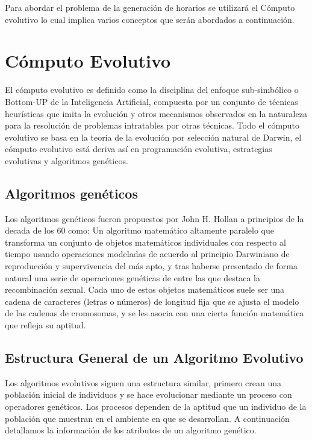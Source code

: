 \label{sec:marcoTeo}
	
	Para abordar el problema de la generación de horarios se utilizará el Cómputo evolutivo lo cual implica varios conceptos que serán abordados a continuación.

	\section{Cómputo Evolutivo}
		
		El cómputo evolutivo es definido como la disciplina del enfoque sub-simbólico o Bottom-UP de la Inteligencia Artificial, compuesta por un conjunto de técnicas heurísticas que imita la evolución y otros mecanismos observados en la naturaleza para la resolución de problemas intratables por otras técnicas. Todo el cómputo evolutivo se basa en la teoría de la evolución por selección natural de Darwin, el cómputo evolutivo está deriva así en programación evolutiva, estrategias evolutivas y algoritmos genéticos.

		\subsection{Algoritmos genéticos}
		Los algoritmos genéticos fueron propuestos por John H. Hollan a principios de la decada de los 60 como: 
			Un algoritmo matemático altamente paralelo que transforma un conjunto de objetos matemáticos individuales con respecto al tiempo usando operaciones modeladas de acuerdo al principio Darwiniano de reproducción y supervivencia del más apto, y tras haberse presentado de forma natural una serie de operaciones genéticas de entre las que destaca la recombinación sexual. Cada uno de estos objetos matemáticos suele ser una cadena de caracteres (letras o números) de longitud fija que se ajusta el modelo de las cadenas de cromosomas, y se les asocia con una cierta función matemática que refleja su aptitud.

		\subsection{Estructura General de un Algoritmo Evolutivo}

		Los algoritmos evolutivos siguen una estructura similar, primero crean una población inicial de individuos y se hace evolucionar mediante un proceso con operadores genéticos. Los procesos dependen de la aptitud que un individuo de la población que muestran en el ambiente en que se desarrollan. A continuación detallamos la información de los atributos de un algoritmo genético.

